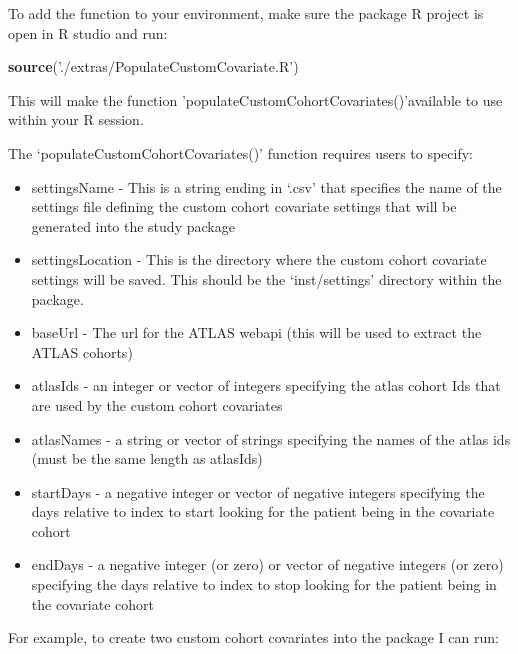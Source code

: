 \documentclass[
]{article}
\newenvironment{Shaded}{\begin{snugshade}}{\end{snugshade}}
\newcommand{\KeywordTok}[1]{\textcolor[rgb]{0.13,0.29,0.53}{\textbf{#1}}}
\newcommand{\NormalTok}[1]{#1}
\newcommand{\StringTok}[1]{\textcolor[rgb]{0.31,0.60,0.02}{#1}}
\providecommand{\tightlist}{%
  \setlength{\itemsep}{0pt}\setlength{\parskip}{0pt}}
\begin{document}
To add the function to your environment, make sure the package R project
is open in R studio and run:

\begin{Shaded}
\begin{Highlighting}[]
\KeywordTok{source}\NormalTok{(}\StringTok{'./extras/PopulateCustomCovariate.R'}\NormalTok{)}
\end{Highlighting}
\end{Shaded}

This will make the function 'populateCustomCohortCovariates()'available
to use within your R session.

The `populateCustomCohortCovariates()' function requires users to
specify:

\begin{itemize}
\tightlist
\item
  settingsName - This is a string ending in `.csv' that specifies the
  name of the settings file defining the custom cohort covariate
  settings that will be generated into the study package
\item
  settingsLocation - This is the directory where the custom cohort
  covariate settings will be saved. This should be the `inst/settings'
  directory within the package.
\item
  baseUrl - The url for the ATLAS webapi (this will be used to extract
  the ATLAS cohorts)
\item
  atlasIds - an integer or vector of integers specifying the atlas
  cohort Ids that are used by the custom cohort covariates
\item
  atlasNames - a string or vector of strings specifying the names of the
  atlas ids (must be the same length as atlasIds)
\item
  startDays - a negative integer or vector of negative integers
  specifying the days relative to index to start looking for the patient
  being in the covariate cohort
\item
  endDays - a negative integer (or zero) or vector of negative integers
  (or zero) specifying the days relative to index to stop looking for
  the patient being in the covariate cohort
\end{itemize}

For example, to create two custom cohort covariates into the package I
can run:
\end{document}
